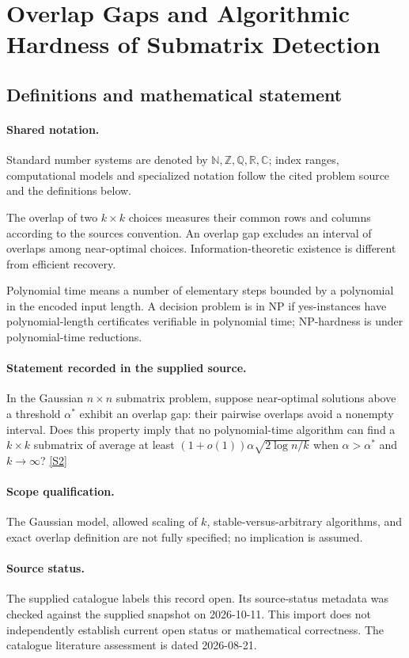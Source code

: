 \documentclass[11pt]{article}
\newcommand{\sref}[2]{\hyperlink{source:#1:#2}{[S#2]}}
\begin{document}
\section{Overlap Gaps and Algorithmic Hardness of Submatrix Detection}\label{statement}

\subsection{Definitions and mathematical statement}

\paragraph{Shared notation.}Standard number systems are denoted by $\mathbb N,\mathbb Z,\mathbb Q,\mathbb R,\mathbb C$; index ranges, computational models and specialized notation follow the cited problem source and the definitions below.


The overlap of two $k\times k$ choices measures their common rows and columns according to the source\textquotesingle s convention. An overlap gap excludes an interval of overlaps among near-optimal choices. Information-theoretic existence is different from efficient recovery.

Polynomial time means a number of elementary steps bounded by a polynomial in the encoded input length. A decision problem is in $\mathrm{NP}$ if yes-instances have polynomial-length certificates verifiable in polynomial time; NP-hardness is under polynomial-time reductions.
\paragraph{Statement recorded in the supplied source.}
In the Gaussian $n\times n$ submatrix problem, suppose near-optimal solutions above a threshold $\alpha^*$ exhibit an overlap gap: their pairwise overlaps avoid a nonempty interval. Does this property imply that no polynomial-time algorithm can find a $k\times k$ submatrix of average at least $(1+o(1))\alpha\sqrt{2\log n/k}$ when $\alpha>\alpha^*$ and $k\to\infty$? \sref{statement}{2}
\paragraph{Scope qualification.}
The Gaussian model, allowed scaling of $k$, stable-versus-arbitrary algorithms, and exact overlap definition are not fully specified; no implication is assumed.
\paragraph{Source status.}
The supplied catalogue labels this record open. Its source-status metadata was checked against the supplied snapshot on 2026-10-11. This import does not independently establish current open status or mathematical correctness. The catalogue literature assessment is dated 2026-08-21.
\end{document}
